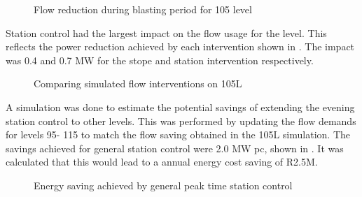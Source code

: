	\begin{figure}[h!]
		\centering
		
		\caption{Flow reduction during blasting period for 105 level}
		\label{fig: 105 Flow savings}
	\end{figure}
Station control had the largest impact on the flow usage for the level. This reflects the power reduction achieved by each intervention shown in . The impact was 0.4 and 0.7 MW for the stope and station intervention respectively.
	
	\begin{figure}[h!]
		\centering
		
		\caption{Comparing simulated flow interventions on 105L}
		\label{fig: Station vs stope}
	\end{figure}
A simulation was done to estimate the potential savings of extending the evening station control to other levels. This was performed by updating the flow demands for levels 95- 115 to match the flow saving obtained in the 105L simulation. The savings achieved for general station control were 2.0 MW \gls{pc}, shown in . It was calculated that this would lead to a annual energy cost saving of R2.5M.
\begin{figure}[h!]
	\centering
	
	\caption{Energy saving achieved by general peak time station control }
	\label{fig: General station optimise}
\end{figure}
